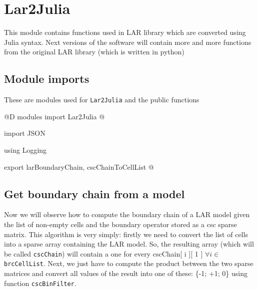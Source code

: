 \documentclass[11pt,oneside]{article}	%
\begin{document}
\section{Lar2Julia}\label{sec:Lar2Julia}
This module contains functions used in LAR library which are converted using Julia syntax. Next versions of the software will contain more and more functions from the original LAR library (which is written in python)

\subsection{Module imports}\label{sec:Lar2JuliaImports}

These are modules used for \texttt{Lar2Julia} and the public functions

@D modules import Lar2Julia
@{import JSON

using Logging

export larBoundaryChain, cscChainToCellList @}

\subsection{Get boundary chain from a model}\label{sec:boundaryChain}

Now we will observe how to compute the boundary chain of a LAR model given the list of non-empty cells and the boundary operator stored as a csc sparse matrix.
This algorithm is very simply: firstly we need to convert the list of cells into a sparse array containing the LAR model.
So, the resulting array (which will be called \texttt{cscChain}) will contain a one  for every cscChain[ i ][ 1 ] $\forall i \in$ \texttt{brcCellList}. Next, we just have to compute the product between the two sparse matrices and convert all values of the result into one of these: \{-1; +1; 0\} using function \texttt{cscBinFilter}.
\end{document}
